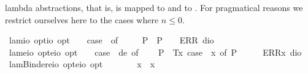 \begin{isabellebody}
\begin{isamarkuptext}
 lambda abstractions, that is,  is mapped to  and  
 to .
 For pragmatical reasons we restrict ourselves here to the cases where $n\leq 0$.%
\end{isamarkuptext}%
\isamarkuptrue%
\isamarkupfalse%
\ lam{}{\isacharcolon}{\isacharcolon}{\isachardoublequoteopen}io\ opt{\isasymRightarrow}io\ opt{\isachardoublequoteclose}{\isacharparenleft}{\isachardoublequoteopen}\isactrlbold {\isasymlambda}\ \ {\isachardoublequoteopen}\isactrlbold {\isasymlambda}\ {\isasymequiv}\ case\ {\isasymphi}\ of\ \isanewline
\ \ \ \ P{\isacharparenleft}{\isasympsi}{\isacharparenright}\ {\isasymRightarrow}\ P{\isacharparenleft}{\isasympsi}{\isacharparenright}\ {\isacharbar}\ {\isacharunderscore}\ {\isasymRightarrow}\ ERR\ dio{\isachardoublequoteclose}\ \ \isanewline
\isanewline
{}\isamarkupfalse%
\ lam{\isacharcolon}{\isacharcolon}{\isachardoublequoteopen}{\isacharparenleft}e{\isasymRightarrow}io\ opt{\isacharparenright}{\isasymRightarrow}{\isacharparenleft}e{\isasymRightarrow}io{\isacharparenright}\ opt{\isachardoublequoteclose}{\isacharparenleft}{\isachardoublequoteopen}\isactrlbold {\isasymlambda}{\isachardoublequoteclose}{\isacharparenright}\ \ {\isachardoublequoteopen}\isactrlbold {\isasymlambda}{\isasymPhi}\ {\isasymequiv}\ case\ {\isacharparenleft}{\isasymPhi}\ de{\isacharparenright}\ of\isanewline
\ \ \ \ P{\isacharparenleft}{\isasymphi}{\isacharparenright}\ {\isasymRightarrow}\ T{\isacharparenleft}{\isasymlambda}x{\isachardot}\ case\ {\isacharparenleft}{\isasymPhi}\ x{\isacharparenright}\ of\ P{\isacharparenleft}{\isasymphi}{\isacharparenright}\ {\isasymRightarrow}\ {\isasymphi}{\isacharparenright}\ {\isacharbar}\ {\isacharunderscore}\ {\isasymRightarrow}\ ERR{\isacharparenleft}{\isasymlambda}x{\isachardot}\ dio{\isacharparenright}{\isachardoublequoteclose}\isanewline
{}\isamarkupfalse%
\ lam{}Binder{\isacharcolon}{\isacharcolon}{\isachardoublequoteopen}{\isacharparenleft}e{\isasymRightarrow}io\ opt{\isacharparenright}{\isasymRightarrow}{\isacharparenleft}e{\isasymRightarrow}io{\isacharparenright}\ opt{\isachardoublequoteclose}\ {\isacharparenleft}\ {\isachardoublequoteopen}\isactrlbold {\isasymlambda}{\isachardoublequoteclose}\ {\isacharbrackleft}{}{\isacharbrackright}\ {}{\isacharparenright}\ \ \ {\isachardoublequoteopen}\isactrlbold {\isasymlambda}\ x{\isachardot}\ {\isasymphi}\ x\ {\isasymequiv}\ \isactrlbold {\isasymlambda}\ {\isasymphi}{\isachardoublequoteclose}\isanewline

\end{isabellebody}
